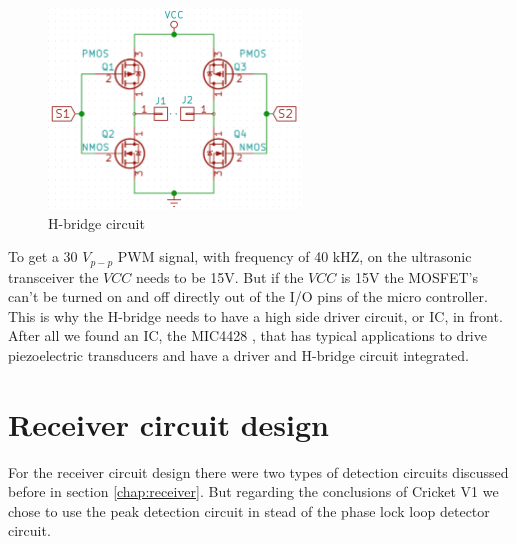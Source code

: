 \begin{figure}[H]
\centering
\includegraphics[width=0.6\textwidth]{Figures/hbridge.PNG}
\caption{H-bridge circuit}
\label{fig:h_bridge}
\end{figure}

To get a 30 $V_{p-p}$ PWM signal, with frequency of 40 kHZ, on the ultrasonic transceiver the $VCC$ needs to be 15V. But if the $VCC$ is 15V the MOSFET's can't be turned on and off directly out of the I/O pins of the micro controller. This is why the H-bridge needs to have a high side driver circuit, or IC, in front. After all we found an IC, the MIC4428 \cite{MIC4428}, that has typical applications to drive piezoelectric transducers and have a driver and H-bridge circuit integrated.

\section{Receiver circuit design}
\label{chap:receivercircuit}
For the receiver circuit design there were two types of detection circuits discussed before in section \ref{chap:receiver}. But regarding the conclusions of Cricket V1 we chose to use the peak detection circuit in stead of the phase lock loop detector circuit.

